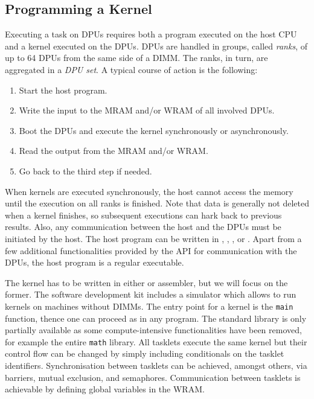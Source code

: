 \subsection{Programming a Kernel}
\label{sec:prereq:arch:code}

Executing a task on \acp{DPU} requires both a program executed on the host \ac{CPU} and a kernel executed on the \acp{DPU}.
\Acp{DPU} are handled in groups, called \emph{ranks}, of up to 64 \acp{DPU} from the same side of a \ac{DIMM}.
The ranks, in turn, are aggregated in a \emph{\ac{DPU} set}.
A typical course of action is the following:
\begin{enumerate}
	\item
	Start the host program.

	\item
	Write the input to the \ac{MRAM} and/or \ac{WRAM} of all involved \acp{DPU}.

	\item
	Boot the \acp{DPU} and execute the kernel synchronously or asynchronously.

	\item
	Read the output from the \ac{MRAM} and/or \ac{WRAM}.

	\item
	Go back to the third step if needed.
\end{enumerate}
When kernels are executed synchronously, the host cannot access the memory until the execution on all ranks is finished.
Note that data is generally not deleted when a kernel finishes, so subsequent executions can hark back to previous results.
Also, any communication between the host and the \acp{DPU} must be initiated by the host.
The host program can be written in \langC{}, \langCpp{}, \langJava{}, or \langPython{}.
Apart from a few additional functionalities provided by the \upmem{} \ac{API} for communication with the \acp{DPU}, the host program is a regular executable.

The kernel has to be written in either \langC{} or assembler, but we will focus on the former.
The software development kit includes a simulator which allows to run kernels on machines without \upmem{} \acp{DIMM}.
The entry point for a kernel is the \lstinline|main| function, thence one can proceed as in any \langC{} program.
The \langC{} standard library is only partially available as some compute-intensive functionalities have been removed, for example the entire \lstinline|math| library.
All tasklets execute the same kernel but their control flow can be changed by simply including conditionals on the tasklet identifiers.
Synchronisation between tasklets can be achieved, amongst others, via barriers, mutual exclusion, and semaphores.
Communication between tasklets is achievable by defining global variables in the \ac{WRAM}.

